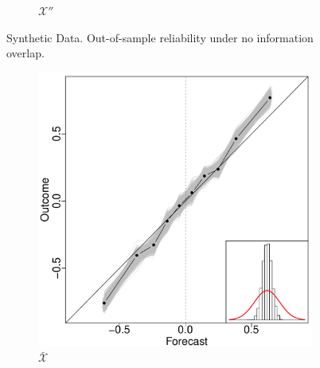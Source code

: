 \documentclass[12pt]{article}
\theoremstyle{definition}
\theoremstyle{definition}
\begin{document}
\begin{figure}[t!]
\begin{subfigure}[b]{0.240\textwidth}
                \caption{$\mathcal{X}''$ }
        \label{RevNoOverlap}
        \end{subfigure}
          \caption{Synthetic Data. Out-of-sample reliability under no information overlap. }
        \label{NOVerlap}
\end{figure}


\begin{figure}[t!]
        \centering
        \begin{subfigure}[b]{0.240\textwidth}
                \includegraphics[width=\textwidth]{SimDepELP.pdf}
                \caption{$\bar{\mathcal{X}}$}
        \label{RelEWAHigh}
        \end{subfigure}%
        ~ %
        \begin{subfigure}[b]{0.240\textwidth}

\end{subfigure}
\end{figure}
\end{document}
